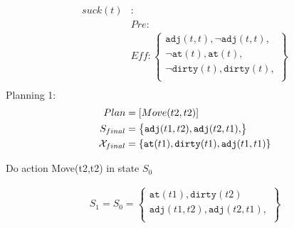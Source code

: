 \documentclass[\master/Master.tex]{subfiles}
\begin{document}
\begin{align*}
	suck(t) &: \\
	& Pre : 
	\\
	& Eff : 
	\left\{
	\begin{gathered}
		\texttt{adj}(t,t), \neg \texttt{adj}(t,t), \\					
		\neg \texttt{at}(t), \texttt{at}(t), \\			
		\neg \texttt{dirty}(t), \texttt{dirty}(t), \\
	\end{gathered}
	\right\}
	\\
\end{align*}
Planning 1:
\begin{align*}
	Plan &= [Move(t2,t2)]\\
	S_{final} &=  \left\{
	\begin{gathered}
		\texttt{adj}(t1,t2), \texttt{adj}(t2,t1), \\
	\end{gathered}
	\right\}\\
	\mathcal{X}_{final} &= \{\texttt{at}(t1),\texttt{dirty}(t1), \texttt{adj}(t1,t1) \}
\end{align*}

Do action Move(t2,t2) in state $S_0$

\begin{align*}
	S_1 = S_0 = \left\{
	\begin{gathered}
		\texttt{at}(t1),\texttt{dirty}(t2) \\
		\texttt{adj}(t1,t2), \texttt{adj}(t2,t1), \\
	\end{gathered}
	\right\} 
\end{align*}
\end{document}
